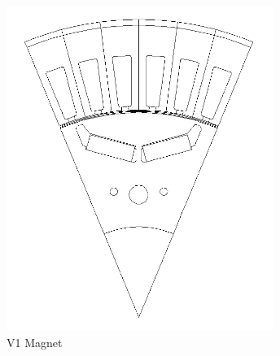 \documentclass[a4paper,12pt]{article}
\begin{document}
\begin{figure}[h]
    \centering
    \begin{minipage}[b]{0.3\textwidth}
        \includegraphics[width=\textwidth]{./ReportImages/1V_Magnet.png}
        \caption{V1 Magnet}
        \label{fig:V1 Magnet}
    \end{minipage}
    \hfill
    \begin{minipage}[b]{0.3\textwidth}

\end{minipage}
\end{figure}
\end{document}
